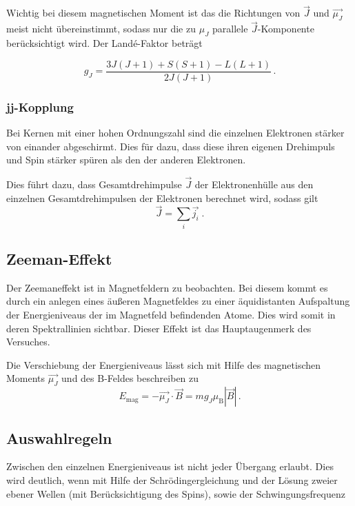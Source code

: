 \noindent
Wichtig bei diesem magnetischen Moment ist das die Richtungen von $\vec{J}$ und $\vec{\mu_J}$ meist nicht übereinstimmt, sodass
nur die zu $\mu_J$ parallele $\vec{J}$-Komponente berücksichtigt wird. Der Landé-Faktor beträgt 

\begin{equation}
    g_J = \frac{3J(J+1) + S(S+1) - L(L+1)}{2J(J+1)}\, .
    \label{eqn:lande}
\end{equation}


\subsubsection{jj-Kopplung}

Bei Kernen mit einer hohen Ordnungszahl sind die einzelnen Elektronen stärker von einander abgeschirmt. Dies für dazu, dass diese ihren eigenen Drehimpuls und Spin stärker 
spüren als den der anderen Elektronen. 

\noindent
Dies führt dazu, dass Gesamtdrehimpulse $\vec{J}$ der Elektronenhülle aus den einzelnen Gesamtdrehimpulsen der Elektronen berechnet wird, sodass gilt
\begin{equation}
    \vec{J} = \sum_i \vec{j_i} \; .
\end{equation}



\subsection{Zeeman-Effekt}
Der Zeemaneffekt ist in Magnetfeldern zu beobachten. Bei diesem kommt es durch ein anlegen eines äußeren Magnetfeldes zu einer äquidistanten Aufspaltung der Energieniveaus der im
Magnetfeld befindenden Atome. Dies wird somit in deren Spektrallinien sichtbar. Dieser Effekt ist das Hauptaugenmerk des Versuches.

\noindent
Die Verschiebung der Energieniveaus lässt sich mit Hilfe des magnetischen Moments $\vec{\mu_J}$ und des B-Feldes beschreiben zu 
\begin{equation}
    E_\text{mag} = - \vec{\mu_J} \cdot \vec{B} = m g_J \mu_\text{B} |\vec{B}| \, .
    \label{eqn:energie}
\end{equation} 

\subsection{Auswahlregeln}
Zwischen den einzelnen Energieniveaus ist nicht jeder Übergang erlaubt. Dies wird deutlich, wenn mit Hilfe der Schrödingergleichung und der Lösung zweier ebener Wellen (mit Berücksichtigung
des Spins), sowie der Schwingungsfrequenz

